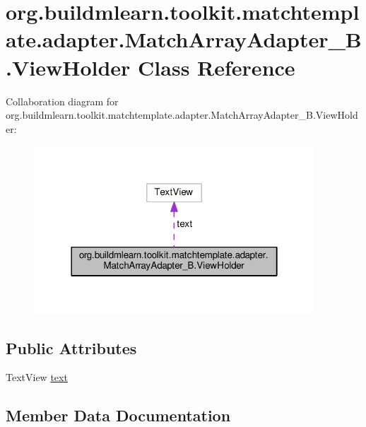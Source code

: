 \hypertarget{classorg_1_1buildmlearn_1_1toolkit_1_1matchtemplate_1_1adapter_1_1MatchArrayAdapter__B_1_1ViewHolder}{}\section{org.\+buildmlearn.\+toolkit.\+matchtemplate.\+adapter.\+Match\+Array\+Adapter\+\_\+\+B.\+View\+Holder Class Reference}
\label{classorg_1_1buildmlearn_1_1toolkit_1_1matchtemplate_1_1adapter_1_1MatchArrayAdapter__B_1_1ViewHolder}


Collaboration diagram for org.\+buildmlearn.\+toolkit.\+matchtemplate.\+adapter.\+Match\+Array\+Adapter\+\_\+\+B.\+View\+Holder\+:
\nopagebreak
\begin{figure}[H]
\begin{center}
\leavevmode
\includegraphics[width=298pt]{classorg_1_1buildmlearn_1_1toolkit_1_1matchtemplate_1_1adapter_1_1MatchArrayAdapter__B_1_1ViewHolder__coll__graph}
\end{center}
\end{figure}
\subsection*{Public Attributes}
\begin{DoxyCompactItemize}
\item 
Text\+View \hyperlink{classorg_1_1buildmlearn_1_1toolkit_1_1matchtemplate_1_1adapter_1_1MatchArrayAdapter__B_1_1ViewHolder_a45f5c17f9447809c08d787ca5b722851}{text}
\end{DoxyCompactItemize}


\subsection{Member Data Documentation}
